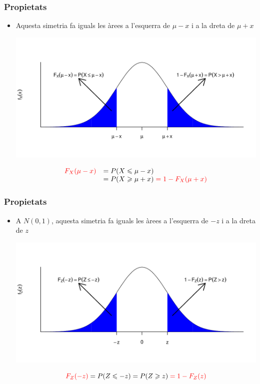 \documentclass[12pt,t]{beamer}\usepackage[]{graphicx}\usepackage[]{color}
\newcommand{\red}[1]{\textcolor{red}{#1}}
\renewcommand{\leq}{\leqslant}
\renewcommand{\geq}{\geqslant}
\theoremstyle{plain}
\theoremstyle{definition}
\begin{document}
\begin{frame}
\frametitle{Propietats} 
\begin{itemize}
\item Aquesta simetria fa iguals les àrees a l'esquerra de $\mu-x$ i a la dreta de $\mu+x$

\begin{center}
\includegraphics[width=\linewidth]{simnorm1}
\end{center}
\vspace*{-1.5cm}

$$
\begin{array}{rl}
\red{F_{X}(\mu-x)} & =P(X\leq \mu-x)\\ &
=P(X\geq \mu+x) \red{{} =1-F_{X}(\mu+x)}
\end{array}
$$
\end{itemize}
\end{frame}


\begin{frame}
\frametitle{Propietats} 
\begin{itemize}
\item A $N(0,1)$, aquesta simetria fa iguals  les àrees a l'esquerra de $-z$ i a la dreta de $z$
\begin{center}
\includegraphics[width=\linewidth]{simnorm2}
\end{center}
\vspace*{-1cm}

$$
\red{F_{Z}(-z)}=P(Z\leq -z)=P(Z\geq  z)\red{{} =1-F_{Z}(z)}
$$
\end{itemize}
\end{frame}
\end{document}
